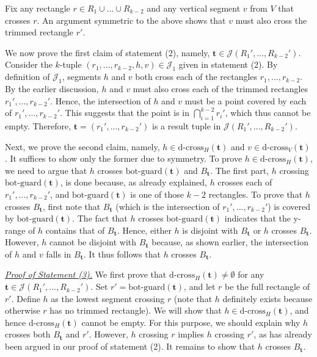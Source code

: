 \documentclass[acmsmall,review,anonymous]{acmart}
\def\vgap{\vspace{1mm}}
\def\extraspacing{\vspace{2mm} \noindent}
\def\J{\mathcal{J}}
\def\gbot{\mathrm{bot\text{-}guard}}
\def\dcross{\mathrm{d\text{-}cross}}
\begin{document}
{{{\vgap

Fix any rectangle $r \in R_1 \cup ... \cup R_{k-2}$ and any vertical segment $v$ from $V$ that crosses $r$. An argument symmetric to the above shows that $v$ must also cross the trimmed rectangle $r'$.

\vgap

We now prove the first claim of statement (2), namely, $\bm{t}\in \J(R_1',...,R_{k-2}')$. Consider the $k$-tuple $(r_1,...,r_{k-2},h,v)\in \J_1$ given in statement (2). By definition of $\J_1$, segments $h$ and $v$ both cross each of the rectangles $r_1,..., r_{k-2}$. By the earlier discussion, $h$ and $v$ must also cross each of the trimmed rectangles $r_1',..., r_{k-2}'$. Hence, the intersection of $h$ and $v$ must be a point covered by each of $r_1',..., r_{k-2}'$. This suggests that the point is in $\bigcap_{i = 1}^{k-2}r_i'$, which thus cannot be empty. Therefore, $\bm{t} = (r_1', ..., r_{k-2}')$ is a result tuple in $\J(R_1',...,R_{k-2}')$.

\vgap 

Next, we prove the second claim, namely, $h \in \dcross_H(\bm{t})$ and $v \in \dcross_V(\bm{t})$. It suffices to show only the former due to symmetry. To prove $h \in \dcross_H(\bm{t})$, we need to argue that $h$ crosses $\gbot(\bm{t})$ and $B_\bm{t}$. The first part, $h$ crossing $\gbot(\bm{t})$, is done because, as already explained, $h$ crosses each of $r_1', ..., r_{k-2}'$, and $\gbot(\bm{t})$ is one of those $k-2$ rectangles. To prove that $h$ crosses $B_\bm{t}$, first note that $B_\bm{t}$ (which is the intersection of $r_1', ..., r_{k-2}'$) is covered by $\gbot(\bm{t})$. The fact that $h$ crosses $\gbot(\bm{t})$ indicates that the y-range of $h$ contains that of $B_\bm{t}$. Hence, either $h$ is disjoint with $B_\bm{t}$ or $h$ crosses $B_\bm{t}$. However, $h$ cannot be disjoint with $B_\bm{t}$ because, as shown earlier, the intersection of $h$ and $v$ falls in $B_\bm{t}$. It thus follows that $h$ crosses $B_\bm{t}$.

\extraspacing \underline{\em Proof of Statement (3).} We first prove that $\dcross_H(\bm{t}) \neq \emptyset$ for any $\bm{t} \in \J(R_1',...,R_{k-2}')$. Set $r' = \gbot(\bm{t})$, and let $r$ be the full rectangle of $r'$. Define $h$ as the lowest segment crossing $r$ (note that $h$ definitely exists because otherwise $r$ has no trimmed rectangle). We will show that $h \in \dcross_H(\bm{t})$, and hence $\dcross_H(\bm{t})$ cannot be empty. For this purpose, we should explain why $h$ crosses both $B_{\bm{t}}$ and $r'$. However, $h$ crossing $r$ implies $h$ crossing $r'$, as has already been argued in our proof of statement (2). It remains to show that $h$ crosses $B_\bm{t}$.

}}}
\end{document}
